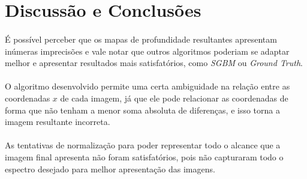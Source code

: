 \documentclass[conference, harvard, brazil, english]{sbatex}
\begin{document}
	
	\section{Discussão e Conclusões}
		\paragraph{}
			É possível perceber que os mapas de profundidade resultantes apresentam inúmeras imprecisões e vale notar que outros algoritmos poderiam se adaptar melhor e apresentar resultados mais satisfatórios, como \textit{SGBM} ou \textit{Ground Truth}.
		\paragraph{}
			O algoritmo desenvolvido permite uma certa ambiguidade na relação entre as coordenadas $ x $ de cada imagem, já que ele pode relacionar as coordenadas de forma que não tenham a menor soma absoluta de diferenças, e isso torna a imagem resultante incorreta.
		\paragraph{}
			As tentativas de normalização para poder representar todo o alcance que a imagem final apresenta não foram satisfatórios, pois não capturaram todo o espectro desejado para melhor apresentação das imagens.
			
	
	
\end{document}
